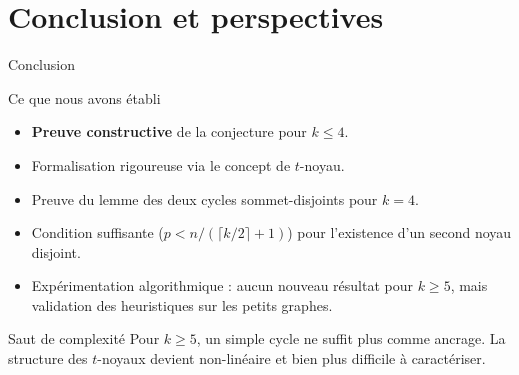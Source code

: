 \section{Conclusion et perspectives}

\begin{frame}{Conclusion}
  \begin{block}{Ce que nous avons \'etabli}
    \begin{itemize}
      \item \textbf{Preuve constructive} de la conjecture pour $k \leq 4$.
      \item Formalisation rigoureuse via le concept de $t$-noyau.
      \item Preuve du lemme des deux cycles sommet-disjoints pour $k=4$.
      \item Condition suffisante ($p < n/(\lceil k/2 \rceil + 1)$) pour l'existence d'un second noyau disjoint.
      \item Exp\'erimentation algorithmique : aucun nouveau résultat pour $k \geq 5$, mais validation des heuristiques sur les petits graphes.
    \end{itemize}
  \end{block}

  \medskip

  \begin{alertblock}{Saut de complexit\'e}
    Pour $k \geq 5$, un simple cycle ne suffit plus comme ancrage. La structure des $t$-noyaux devient non-lin\'eaire et bien plus difficile \`a caract\'eriser.
  \end{alertblock}
\end{frame}

